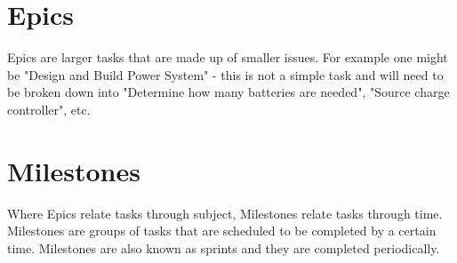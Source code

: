 \documentclass{article}
\begin{document}
\section*{Epics}

Epics are larger tasks that are made up of smaller issues. For example one might
be "Design and Build Power System" - this is not a simple task and will need to
be broken down into "Determine how many batteries are needed", "Source charge
controller", etc.

\section*{Milestones}

Where Epics relate tasks through subject, Milestones relate tasks through time.
Milestones are groups of tasks that are scheduled to be completed by a certain
time. Milestones are also known as sprints and they are completed periodically.
\end{document}
